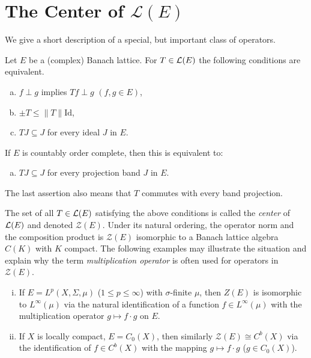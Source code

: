 \section{The Center of $\mathcal{L}(E)$}\label{sec:c1-9}
We give a short description of a special, but important class of operators.

Let $ E $ be a (complex) Banach lattice.
For $ T \in \mathcal{L}(E) $ the following conditions are equivalent.
\begin{enumerate}[(a)]

    \item 
    $ f \perp g $ implies $ Tf \perp g $ \quad $(f, g \in E)$,
    
    \item 
    $ \pm T \leq \|T\|\text{Id}$,
    
    \item 
    $ TJ \subseteq J $ for every ideal $ J $ in $ E $.
    
\end{enumerate}
If $ E $ is countably order complete, then this is equivalent to:
\begin{enumerate}[(a), resume]
    \item 
    $ TJ \subseteq J $ for every projection band $ J $ in $ E $.
\end{enumerate}
The last assertion also means that $ T $ commutes with every band projection.

The set of all $ T \in \mathcal{L}(E) $ satisfying the above conditions is called the \emph{center} of $ \mathcal{L}(E) $ and denoted $ \mathcal{Z}(E) $.
Under its natural ordering, the operator norm and the composition product is $ \mathcal{Z}(E) $ isomorphic to a Banach lattice algebra $ C(K) $ with $ K $ compact.
The following examples may illustrate the situation and explain why the term \emph{multiplication operator} is often used for operators in $ \mathcal{Z}(E) $.
\begin{enumerate}[(i)]
\item 
If $ E = L^{p}(X,\Sigma,\mu) $ ($ 1 \leq p \leq \infty $) with $ \sigma $-finite $ \mu $, then $ Z(E) $ is isomorphic to $ L^{\infty}(\mu) $ via the natural identification of a function $ f \in L^{\infty}(\mu) $ with the multiplication operator $ g \mapsto f\cdot g $ on $ E $. 

\item 
If $ X $ is locally compact, $ E = C_{0}(X) $, then similarly $ \mathcal{Z}(E) \cong C^{b}(X) $ via the identification of $ f \in C^{b}(X) $ with the mapping $ g \mapsto f\cdot g $ ($ g \in C_{0}(X) $).
\end{enumerate}

\RaggedRight

 
